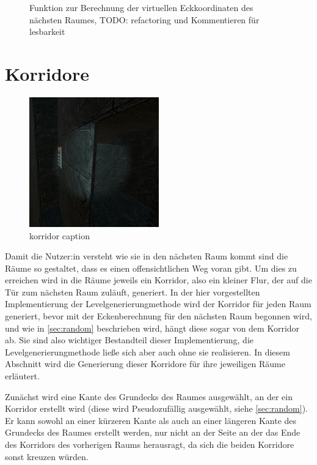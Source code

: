 \begin{figure}[H]%
    \centering
    \caption{Funktion zur Berechnung der virtuellen Eckkoordinaten des nächsten Raumes, TODO:  refactoring und Kommentieren für lesbarkeit}
    \label{figure:calculateNewCornersScript}
\end{figure}

\section{Korridore}
\label{sec:corridor}


\begin{figure}[!h]
    \centering
    \includegraphics[width=0.5\textwidth]{vrscreenshots/korridorheraus.jpg}
    \caption{korridor caption}\label{figure:qqplot-2way}
\end{figure}
Damit die Nutzer:in versteht wie sie in den nächsten Raum kommt sind die Räume so gestaltet, dass es einen offensichtlichen Weg voran gibt. Um dies zu erreichen wird in die Räume jeweils ein Korridor, also ein kleiner Flur, der auf die Tür zum nächsten Raum zuläuft, generiert. In der hier vorgestellten Implementierung der Levelgenerierungmethode wird der Korridor für jeden Raum generiert, bevor mit der Eckenberechnung für den nächsten Raum begonnen wird, und wie in \autoref{sec:random} beschrieben wird, hängt diese sogar von dem Korridor ab. Sie sind also wichtiger Bestandteil dieser Implementierung, die Levelgenerierungmethode ließe sich aber auch ohne sie realisieren. In diesem Abschnitt wird die Generierung dieser Korridore für ihre jeweiligen Räume erläutert.

Zunächst wird eine Kante des Grundecks des Raumes ausgewählt, an der ein Korridor erstellt wird (diese wird Pseudozufällig ausgewählt, siehe \autoref{sec:random}). Er kann sowohl an einer kürzeren Kante als auch an einer längeren Kante des Grundecks des Raumes erstellt werden, nur nicht an der Seite an der das Ende des Korridors des vorherigen Raums herausragt, da sich die beiden Korridore sonst kreuzen würden.

